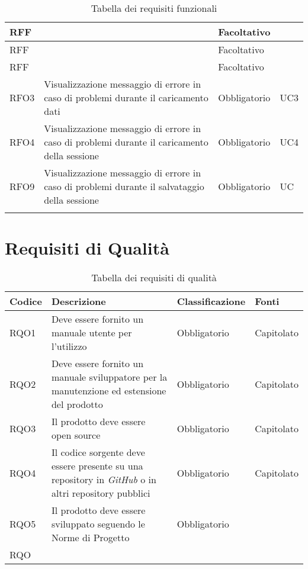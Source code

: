 \begin{table}[H]
\begin{tabular}{|p{}|p{6cm}|p{3cm}|p{2cm}|}
    RFF &  & Facoltativo &  \\ \hline
    \rowcolor[HTML]{EFEFEF}
    RFF &  & Facoltativo &  \\ \hline
    \rowcolor[HTML]{C0C0C0}
    RFF &  & Facoltativo &  \\ \hline
    \rowcolor[HTML]{EFEFEF}
    RFO3 & Visualizzazione messaggio di errore in caso di problemi durante il caricamento dati & Obbligatorio & UC3 \\ \hline
    \rowcolor[HTML]{C0C0C0}
    RFO4 & Visualizzazione messaggio di errore in caso di problemi durante il caricamento della sessione & Obbligatorio & UC4 \\ \hline
    \rowcolor[HTML]{EFEFEF}
    RFO9 & Visualizzazione messaggio di errore in caso di problemi durante il salvataggio della sessione & Obbligatorio & UC \\ \hline
    \rowcolor[HTML]{C0C0C0}
     &  &  & \\ \hline
  \end{tabular}
  \caption{Tabella dei requisiti funzionali}
\end{table}

\section{Requisiti di Qualità}
\begin{table}[H]
  \centering
  \begin{tabular}{|p{}|p{6cm}|p{3cm}|p{2cm}|}
    \hline
    \rowcolor[HTML]{036400}
    {\color[HTML]{FFFFFF} \textbf{Codice}} & {\color[HTML]{FFFFFF} \textbf{Descrizione}} & {\color[HTML]{FFFFFF} \textbf{Classificazione}} & {\color[HTML]{FFFFFF} \textbf{Fonti}} \\ \hline
    \rowcolor[HTML]{EFEFEF}
    RQO1 & Deve essere fornito un manuale utente per l'utilizzo & Obbligatorio & Capitolato \\ \hline
    \rowcolor[HTML]{C0C0C0}
    RQO2 & Deve essere fornito un manuale sviluppatore per la manutenzione ed estensione del prodotto & Obbligatorio & Capitolato \\ \hline
    \rowcolor[HTML]{EFEFEF}
    RQO3 & Il prodotto deve essere open source & Obbligatorio & Capitolato \\ \hline
    \rowcolor[HTML]{C0C0C0}
    RQO4 & Il codice sorgente deve essere presente su una repository in \textit{GitHub} o in altri repository pubblici & Obbligatorio & Capitolato \\ \hline
    \rowcolor[HTML]{EFEFEF}
    RQO5 & Il prodotto deve essere sviluppato seguendo le Norme di Progetto & Obbligatorio &  \\ \hline
    \rowcolor[HTML]{C0C0C0}
    RQO &  &  &  \\ \hline
  \end{tabular}
  \caption{Tabella dei requisiti di qualità}
\end{table}

